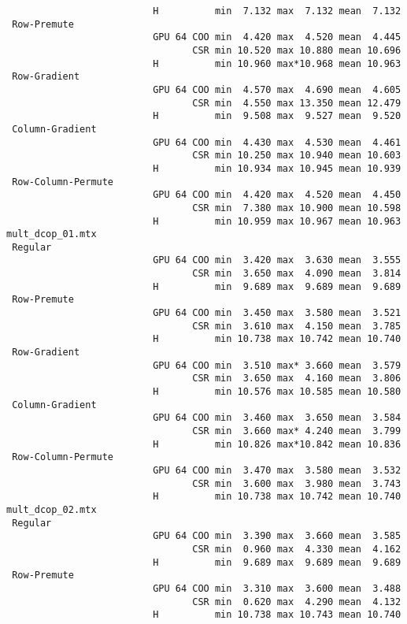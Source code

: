 {\begin{verbatim}
                          H          min  7.132 max  7.132 mean  7.132
 Row-Premute
                          GPU 64 COO min  4.420 max  4.520 mean  4.445
                                 CSR min 10.520 max 10.880 mean 10.696
                          H          min 10.960 max*10.968 mean 10.963
 Row-Gradient
                          GPU 64 COO min  4.570 max  4.690 mean  4.605
                                 CSR min  4.550 max 13.350 mean 12.479
                          H          min  9.508 max  9.527 mean  9.520
 Column-Gradient
                          GPU 64 COO min  4.430 max  4.530 mean  4.461
                                 CSR min 10.250 max 10.940 mean 10.603
                          H          min 10.934 max 10.945 mean 10.939
 Row-Column-Permute
                          GPU 64 COO min  4.420 max  4.520 mean  4.450
                                 CSR min  7.380 max 10.900 mean 10.598
                          H          min 10.959 max 10.967 mean 10.963
mult_dcop_01.mtx
 Regular
                          GPU 64 COO min  3.420 max  3.630 mean  3.555
                                 CSR min  3.650 max  4.090 mean  3.814
                          H          min  9.689 max  9.689 mean  9.689
 Row-Premute
                          GPU 64 COO min  3.450 max  3.580 mean  3.521
                                 CSR min  3.610 max  4.150 mean  3.785
                          H          min 10.738 max 10.742 mean 10.740
 Row-Gradient
                          GPU 64 COO min  3.510 max* 3.660 mean  3.579
                                 CSR min  3.650 max  4.160 mean  3.806
                          H          min 10.576 max 10.585 mean 10.580
 Column-Gradient
                          GPU 64 COO min  3.460 max  3.650 mean  3.584
                                 CSR min  3.660 max* 4.240 mean  3.799
                          H          min 10.826 max*10.842 mean 10.836
 Row-Column-Permute
                          GPU 64 COO min  3.470 max  3.580 mean  3.532
                                 CSR min  3.600 max  3.980 mean  3.743
                          H          min 10.738 max 10.742 mean 10.740
mult_dcop_02.mtx
 Regular
                          GPU 64 COO min  3.390 max  3.660 mean  3.585
                                 CSR min  0.960 max  4.330 mean  4.162
                          H          min  9.689 max  9.689 mean  9.689
 Row-Premute
                          GPU 64 COO min  3.310 max  3.600 mean  3.488
                                 CSR min  0.620 max  4.290 mean  4.132
                          H          min 10.738 max 10.743 mean 10.740

\end{verbatim}}
